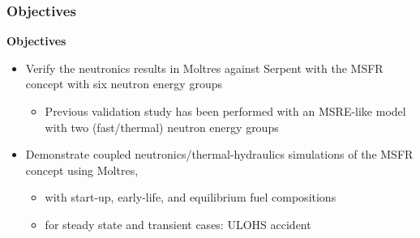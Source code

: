 \begin{frame}
	\frametitle{Objectives}
		\textbf{Objectives}
		\begin{itemize}
			\item Verify the neutronics results in Moltres against Serpent
			\cite{leppanen_serpent_2015} with the \gls{MSFR} concept with six
			neutron energy groups
			\begin{itemize}
				\item Previous validation study has been performed with an
				MSRE-like model with two (fast/thermal) neutron energy groups
				\cite{lindsay_introduction_2018}
			\end{itemize}
			\item Demonstrate coupled neutronics/thermal-hydraulics simulations
			of the \gls{MSFR} concept using Moltres,
			\begin{itemize}
				\item with start-up, early-life, and equilibrium fuel
				compositions
				\item for steady state and transient cases: \gls{ULOHS} accident
			\end{itemize}
		\end{itemize}
\end{frame}
